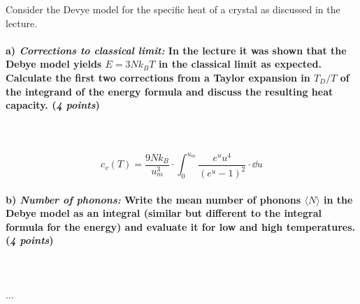 Consider the Devye model for the specific heat of a crystal as discussed 
in the lecture.

\paragraph{a) \textit{Corrections to classical limit:} In the lecture it was 
    shown that the Debye model yields $E=3Nk_BT$ in the classical limit as 
    expected. Calculate the first two corrections from a Taylor expansion in 
    $T_D/T$ of the integrand of the energy formula and discuss the 
    resulting heat capacity. (\textit{4 points})
} \ \\
    \\
    \begin{equation}
        c_v(T)
        =\frac{9Nk_B}{u^3_m}\cdot\int_0^{u_m}\frac{e^uu^4}{(e^u-1)^2}\cdot\dd u
    \end{equation}

\paragraph{b) \textit{Number of phonons:} Write the mean number of phonons 
    $\langle N\rangle$ in the Debye model as an integral (similar but 
    different to the integral formula for the energy) and evaluate it for low 
    and high temperatures. (\textit{4 points})
} \ \\
    \\
    ...
